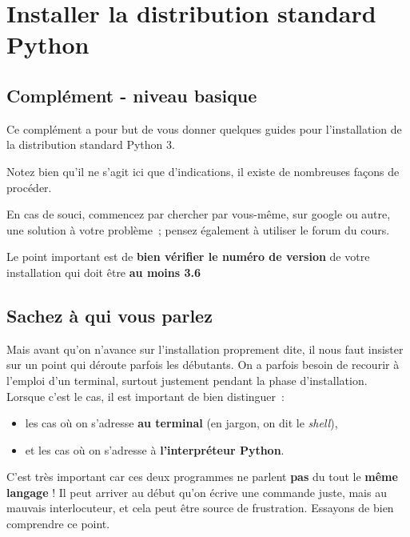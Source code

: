 
    \hypertarget{installer-la-distribution-standard-python}{%
\section{Installer la distribution standard
Python}\label{installer-la-distribution-standard-python}}

    \hypertarget{compluxe9ment---niveau-basique}{%
\subsection{Complément - niveau
basique}\label{compluxe9ment---niveau-basique}}

    Ce complément a pour but de vous donner quelques guides pour
l'installation de la distribution standard Python 3.

Notez bien qu'il ne s'agit ici que d'indications, il existe de
nombreuses façons de procéder.

En cas de souci, commencez par chercher par vous-même, sur google ou
autre, une solution à votre problème~; pensez également à utiliser le
forum du cours.

    Le point important est de \textbf{bien vérifier le numéro de version} de
votre installation qui doit être \textbf{au moins 3.6}

    \hypertarget{sachez-uxe0-qui-vous-parlez}{%
\subsection{Sachez à qui vous
parlez}\label{sachez-uxe0-qui-vous-parlez}}

    Mais avant qu'on n'avance sur l'installation proprement dite, il nous
faut insister sur un point qui déroute parfois les débutants. On a
parfois besoin de recourir à l'emploi d'un terminal, surtout justement
pendant la phase d'installation.\\

Lorsque c'est le cas, il est important de bien distinguer~:

\begin{itemize}
\item
	les cas où on s'adresse \textbf{au terminal} (en jargon, on dit le \emph{shell}),
\item	
	et les cas où on s'adresse à \textbf{l'interpréteur Python}.
\end{itemize}


C'est très important car ces deux programmes ne parlent \textbf{pas} du
tout le \textbf{même langage} ! Il peut arriver au début qu'on écrive
une commande juste, mais au mauvais interlocuteur, et cela peut être
source de frustration. Essayons de bien comprendre ce point.

